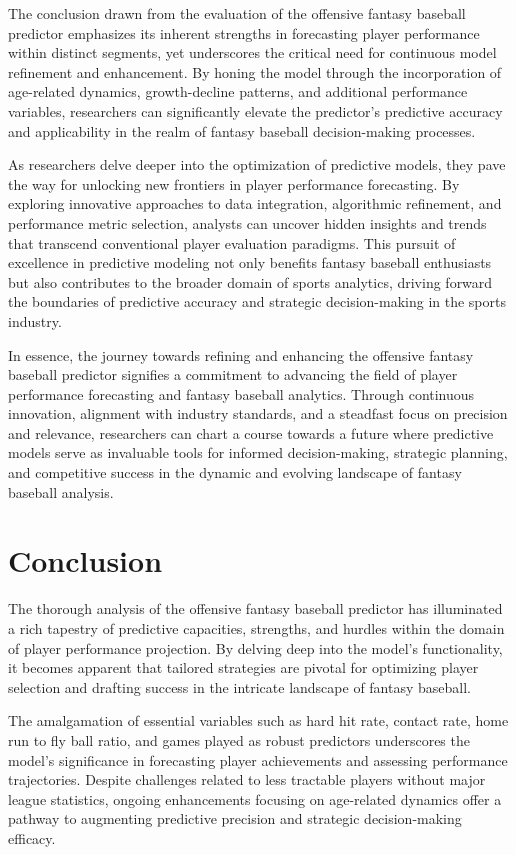 \documentclass[12pt, english]{article}
\begin{document}
The conclusion drawn from the evaluation of the offensive fantasy baseball predictor emphasizes its inherent strengths in forecasting player performance within distinct segments, yet underscores the critical need for continuous model refinement and enhancement. By honing the model through the incorporation of age-related dynamics, growth-decline patterns, and additional performance variables, researchers can significantly elevate the predictor's predictive accuracy and applicability in the realm of fantasy baseball decision-making processes.

As researchers delve deeper into the optimization of predictive models, they pave the way for unlocking new frontiers in player performance forecasting. By exploring innovative approaches to data integration, algorithmic refinement, and performance metric selection, analysts can uncover hidden insights and trends that transcend conventional player evaluation paradigms. This pursuit of excellence in predictive modeling not only benefits fantasy baseball enthusiasts but also contributes to the broader domain of sports analytics, driving forward the boundaries of predictive accuracy and strategic decision-making in the sports industry.

In essence, the journey towards refining and enhancing the offensive fantasy baseball predictor signifies a commitment to advancing the field of player performance forecasting and fantasy baseball analytics. Through continuous innovation, alignment with industry standards, and a steadfast focus on precision and relevance, researchers can chart a course towards a future where predictive models serve as invaluable tools for informed decision-making, strategic planning, and competitive success in the dynamic and evolving landscape of fantasy baseball analysis.

\section{Conclusion}

The thorough analysis of the offensive fantasy baseball predictor has illuminated a rich tapestry of predictive capacities, strengths, and hurdles within the domain of player performance projection. By delving deep into the model's functionality, it becomes apparent that tailored strategies are pivotal for optimizing player selection and drafting success in the intricate landscape of fantasy baseball.


The amalgamation of essential variables such as hard hit rate, contact rate, home run to fly ball ratio, and games played as robust predictors underscores the model's significance in forecasting player achievements and assessing performance trajectories. Despite challenges related to less tractable players without major league statistics, ongoing enhancements focusing on age-related dynamics offer a pathway to augmenting predictive precision and strategic decision-making efficacy.
\end{document}
